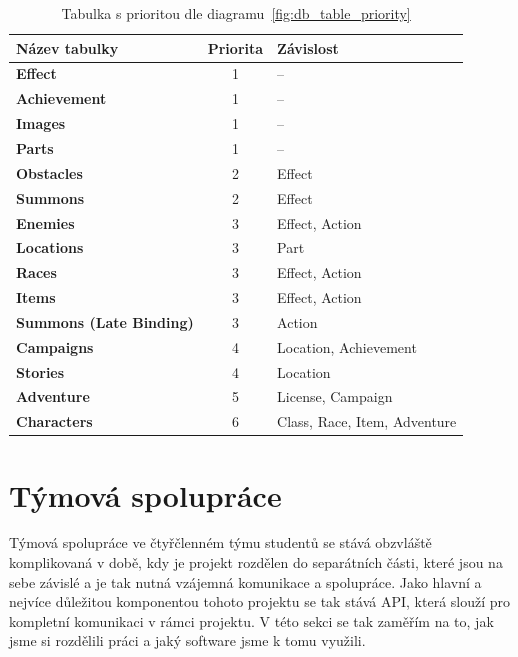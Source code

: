 \begin{table}[H]
    \centering
        \begin{tabular}{l c l}
            \toprule

            \textbf{Název tabulky} & \textbf{Priorita} & \textbf{Závislost} \\
            \midrule

            \textbf{Effect} & 1 & -- \\
            \textbf{Achievement} & 1 & -- \\
            \textbf{Images} & 1 & -- \\
            \textbf{Parts} & 1 & -- \\
            \textbf{Obstacles} & 2 & Effect \\
            \textbf{Summons} & 2 & Effect \\
            \textbf{Enemies} & 3 & Effect, Action \\
            \textbf{Locations} & 3 & Part \\
            \textbf{Races} & 3 & Effect, Action \\
            \textbf{Items} & 3 & Effect, Action \\
            \textbf{Summons (Late Binding)} & 3 & Action \\
            \textbf{Campaigns} & 4 & Location, Achievement \\
            \textbf{Stories} & 4 & Location \\
            \textbf{Adventure} & 5 & License, Campaign \\
            \textbf{Characters} & 6 & Class, Race, Item, Adventure \\

            \bottomrule
        \end{tabular}
    \caption{Tabulka s prioritou dle diagramu~\ref{fig:db_table_priority}
    \label{tab:db_table_priority}}
\end{table}

\section{Týmová spolupráce}
\label{sec:implementation-collaboration}
Týmová spolupráce ve čtyřčlenném týmu studentů se stává obzvláště komplikovaná v době, kdy je projekt rozdělen do separátních části, které jsou na sebe závislé a je tak nutná vzájemná komunikace a spolupráce. Jako hlavní a nejvíce důležitou komponentou tohoto projektu se tak stává API, která slouží pro kompletní komunikaci v rámci projektu. V této sekci se tak zaměřím na to, jak jsme si rozdělili práci a jaký software jsme k tomu využili.

